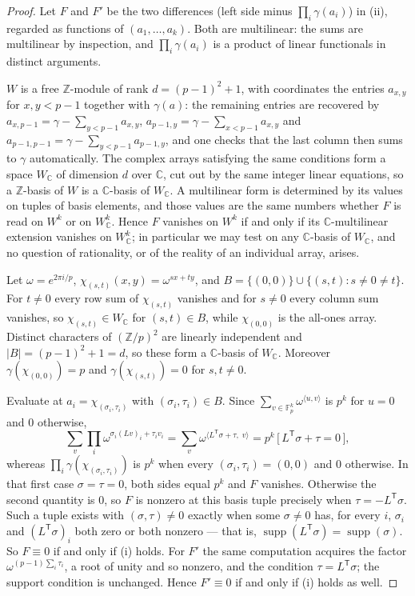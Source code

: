 \documentclass[11pt,a4paper]{amsart}
\theoremstyle{plain}
\theoremstyle{definition}
\theoremstyle{remark}
\newcommand{\FF}{\mathbb{F}}
\newcommand{\ZZ}{\mathbb{Z}}
\newcommand{\CC}{\mathbb{C}}
\newcommand{\supp}{\operatorname{supp}}
\newcommand{\tr}{\mathsf{T}}
\begin{document}
\begin{proof}
Let $F$ and $F'$ be the two differences (left side minus $\prod_i\gamma(a_i)$)
in (ii), regarded as functions of $(a_1,\dots,a_k)$. Both are multilinear: the
sums are multilinear by inspection, and $\prod_i\gamma(a_i)$ is a product of
linear functionals in distinct arguments.

$W$ is a free $\ZZ$-module of rank $d=(p-1)^2+1$, with coordinates the entries
$a_{x,y}$ for $x,y<p-1$ together with $\gamma(a)$: the remaining entries are
recovered by $a_{x,p-1}=\gamma-\sum_{y<p-1}a_{x,y}$,
$a_{p-1,y}=\gamma-\sum_{x<p-1}a_{x,y}$ and
$a_{p-1,p-1}=\gamma-\sum_{y<p-1}a_{p-1,y}$, and one checks that the last column
then sums to $\gamma$ automatically. The complex arrays satisfying the same
conditions form a space $W_\CC$ of dimension $d$ over $\CC$, cut out by the same
integer linear equations, so a $\ZZ$-basis of $W$ is a $\CC$-basis of $W_\CC$.
A multilinear form is determined by its values on tuples of basis elements, and
those values are the same numbers whether $F$ is read on $W^k$ or on $W_\CC^k$.
Hence $F$ vanishes on $W^k$ if and only if its $\CC$-multilinear extension
vanishes on $W_\CC^k$; in particular we may test on any $\CC$-basis of $W_\CC$,
and no question of rationality, or of the reality of an individual array, arises.

Let $\omega=e^{2\pi i/p}$, $\chi_{(s,t)}(x,y)=\omega^{sx+ty}$, and
$B=\{(0,0)\}\cup\{(s,t):s\ne0\ne t\}$. For $t\ne0$ every row sum of
$\chi_{(s,t)}$ vanishes and for $s\ne0$ every column sum vanishes, so
$\chi_{(s,t)}\in W_\CC$ for $(s,t)\in B$, while $\chi_{(0,0)}$ is the all-ones
array. Distinct characters of $(\ZZ/p)^2$ are linearly independent and
$|B|=(p-1)^2+1=d$, so these form a $\CC$-basis of $W_\CC$. Moreover
$\gamma(\chi_{(0,0)})=p$ and $\gamma(\chi_{(s,t)})=0$ for $s,t\ne0$.

Evaluate at $a_i=\chi_{(\sigma_i,\tau_i)}$ with $(\sigma_i,\tau_i)\in B$. Since
$\sum_{v\in\FF_p^k}\omega^{\langle u,v\rangle}$ is $p^k$ for $u=0$ and $0$
otherwise,
\[
\sum_{v}\prod_i\omega^{\sigma_i(Lv)_i+\tau_iv_i}
=\sum_{v}\omega^{\langle L^{\tr}\sigma+\tau,\;v\rangle}
=p^k\,\big[\,L^{\tr}\sigma+\tau=0\,\big],
\]
whereas $\prod_i\gamma(\chi_{(\sigma_i,\tau_i)})$ is $p^k$ when every
$(\sigma_i,\tau_i)=(0,0)$ and $0$ otherwise. In that first case
$\sigma=\tau=0$, both sides equal $p^k$ and $F$ vanishes. Otherwise the second
quantity is $0$, so $F$ is nonzero at this basis tuple precisely when
$\tau=-L^{\tr}\sigma$. Such a tuple exists with $(\sigma,\tau)\ne0$ exactly when
some $\sigma\ne0$ has, for every $i$, $\sigma_i$ and $(L^{\tr}\sigma)_i$ both
zero or both nonzero --- that is, $\supp(L^{\tr}\sigma)=\supp(\sigma)$. So
$F\equiv0$ if and only if (i) holds. For $F'$ the same computation acquires the
factor $\omega^{(p-1)\sum_i\tau_i}$, a root of unity and so nonzero, and the
condition $\tau=L^{\tr}\sigma$; the support condition is unchanged. Hence
$F'\equiv0$ if and only if (i) holds as well.
\end{proof}
\end{document}
